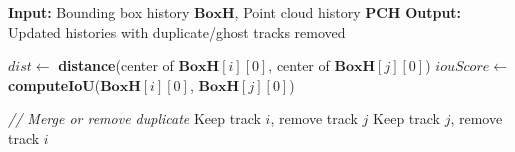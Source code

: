 \documentclass[14pt,a4paper]{article}
\begin{document}
\begin{algorithm}
\caption{RemoveDuplicateTracks - Eliminate Ghost Trajectories}
\begin{algorithmic}[1]

\State \textbf{Input:} Bounding box history $\mathbf{BoxH}$, Point cloud history $\mathbf{PCH}$
\State \textbf{Output:} Updated histories with duplicate/ghost tracks removed

        \State $dist \gets$ \textbf{distance}(center of $\mathbf{BoxH}[i][0]$, center of $\mathbf{BoxH}[j][0]$)
        \State $iouScore \gets$ \textbf{computeIoU}($\mathbf{BoxH}[i][0]$, $\mathbf{BoxH}[j][0]$)
        
            \State \textit{// Merge or remove duplicate}
                \State Keep track $i$, remove track $j$
            \Else
                \State Keep track $j$, remove track $i$
            \EndIf
        \EndIf
        
    \EndFor
\EndFor

\end{algorithmic}
\end{algorithm}
\end{document}
